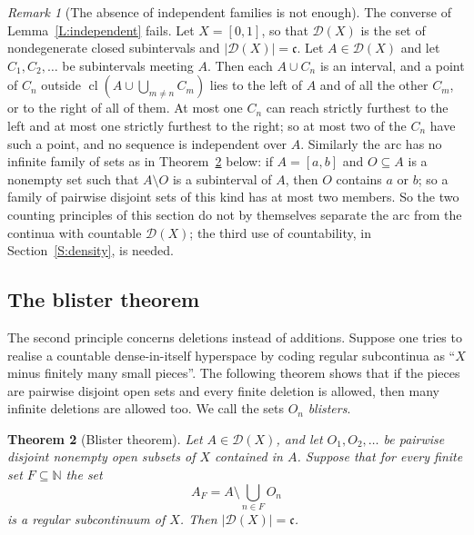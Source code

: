 \documentclass[11pt,reqno]{amsart}
\theoremstyle{plain}
\newtheorem{theorem}{Theorem}[section]
\theoremstyle{definition}
\theoremstyle{remark}
\newtheorem{remark}[theorem]{Remark}
\newcommand{\D}{\mathcal{D}}
\newcommand{\cl}{\operatorname{cl}}
\newcommand{\N}{\mathbb{N}}
\newcommand{\cc}{\mathfrak{c}}
\begin{document}
\begin{remark}[The absence of independent families is not enough]\label{R:arc}
The converse of Lemma~\ref{L:independent} fails. Let $X=[0,1]$, so that $\D(X)$ is the set of nondegenerate closed subintervals and $|\D(X)|=\cc$. Let $A\in\D(X)$ and let $C_1,C_2,\dots$ be subintervals meeting $A$. Then each $A\cup C_n$ is an interval, and a point of $C_n$ outside $\cl(A\cup\bigcup_{m\neq n}C_m)$ lies to the left of $A$ and of all the other $C_m$, or to the right of all of them. At most one $C_n$ can reach strictly furthest to the left and at most one strictly furthest to the right; so at most two of the $C_n$ have such a point, and no sequence is independent over $A$. Similarly the arc has no infinite family of sets as in Theorem~\ref{T:blister} below: if $A=[a,b]$ and $O\subseteq A$ is a nonempty set such that $A\setminus O$ is a subinterval of $A$, then $O$ contains $a$ or $b$; so a family of pairwise disjoint sets of this kind has at most two members. So the two counting principles of this section do not by themselves separate the arc from the continua with countable $\D(X)$; the third use of countability, in Section~\ref{S:density}, is needed.
\end{remark}

\subsection{The blister theorem}
The second principle concerns deletions instead of additions. Suppose one tries to realise a countable dense-in-itself hyperspace by coding regular subcontinua as ``$X$ minus finitely many small pieces''. The following theorem shows that if the pieces are pairwise disjoint open sets and every finite deletion is allowed, then many infinite deletions are allowed too. We call the sets $O_n$ \emph{blisters}.

\begin{theorem}[Blister theorem]\label{T:blister}
Let $A\in\D(X)$, and let $O_1,O_2,\dots$ be pairwise disjoint nonempty open subsets of $X$ contained in $A$. Suppose that for every finite set $F\subseteq\N$ the set
\[
A_F=A\setminus\bigcup_{n\in F}O_n
\]
is a regular subcontinuum of $X$. Then $|\D(X)|=\cc$.
\end{theorem}
\end{document}
